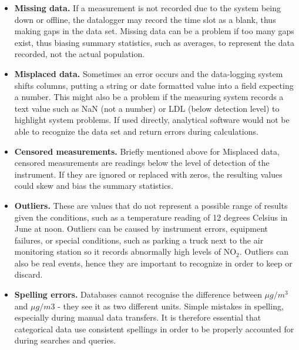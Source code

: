 \begin{itemize}
\item \textbf{Missing data.} If a measurement is not recorded due to the system being down or offline, the datalogger may record the time slot as a blank, thus making gaps in the data set. Missing data can be a problem if too many gaps exist, thus biasing summary statistics, such as averages, to represent the data recorded, not the actual population.
\item \textbf{Misplaced data.} Sometimes an error occurs and the data-logging system shifts columns, putting a string or date formatted value into a field expecting a number. This might also be a problem if the measuring system records a text value such as NaN (not a number) or LDL (below detection level) to highlight system problems. If used directly, analytical software would not be able to recognize the data set and return errors during calculations.
\item \textbf{Censored measurements.} Briefly mentioned above for Misplaced data, censored measurements are readings below the level of detection of the instrument. If they are ignored or replaced with zeros, the resulting values could skew and bias the summary statistics.
\item \textbf{Outliers.} These are values that do not represent a possible range of results given the conditions, such as a temperature reading of 12 degrees Celsius in June at noon. Outliers can be caused by instrument errors, equipment failures, or special conditions, such as parking a truck next to the air monitoring station so it records abnormally high levels of NO$_{2}$. Outliers can also be real events, hence they are important to recognize in order to keep or discard.
\item \textbf{Spelling errors.} Databases cannot recognise the difference between $\mu g/m^{3}$ and  $\mu g/m3$ - they see it as two different units. Simple mistakes in spelling, especially during manual data transfers.  It is therefore essential that categorical data use consistent spellings in order to be properly accounted for during searches and queries.

\end{itemize}

